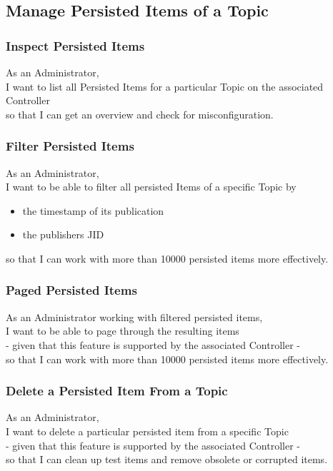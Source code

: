 \subsection{Manage Persisted Items of a Topic}
\subsubsection{Inspect Persisted Items}

As an Administrator,\\
I want to list all Persisted Items for a particular Topic on the associated Controller \\
so that I can get an overview and check for misconfiguration.

\subsubsection{Filter Persisted Items}

As an Administrator,\\
I want to be able to filter all persisted Items of a specific Topic by \\
\begin{itemize}
    \item the timestamp of its publication
    \item the publishers JID
\end{itemize}
so that I can work with more than 10000 persisted items more effectively.

\subsubsection{Paged Persisted Items}
As an Administrator working with filtered persisted items,\\
I want to be able to page through the resulting items\\
- given that this feature is supported by the associated Controller -\\
so that I can work with more than 10000 persisted items more effectively.

\subsubsection{Delete a Persisted Item From a Topic}

As an Administrator,\\
I want to delete a particular persisted item from a specific Topic\\
- given that this feature is supported by the associated Controller -\\
so that I can clean up test items and remove obsolete or corrupted items.

